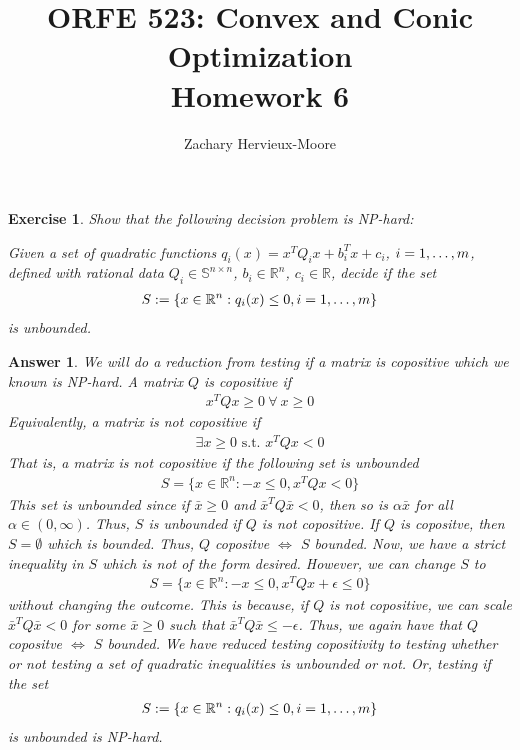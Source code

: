 \documentclass[12pt]{article}
\title{ORFE 523: Convex and Conic Optimization \\ Homework 6}
\author{Zachary Hervieux-Moore}
\date{\displaydate{date}}
\theoremstyle{colon}
\newtheorem{exercise}{Exercise}
\newtheorem*{answer}{Answer}
\begin{document}
\maketitle

\clearpage

\begin{exercise}
  Show that the following decision problem is NP-hard:

  Given a set of quadratic functions $q_i(x) = x^T Q_i x + b_i^T x + c_i$, $i = 1, \mathellipsis, m$, defined with rational data $Q_i \in \mathbb{S}^{n \times n}$, $b_i \in \mathbb{R}^n$, $c_i \in \mathbb{R}$, decide if the set
  \begin{gather*}
    S := \{ x \in \mathbb{R}^n : q_i(x) \leq 0, i = 1, \mathellipsis, m \}
  \end{gather*}
  is unbounded.
\end{exercise}

\begin{answer}
  We will do a reduction from testing if a matrix is copositive which we known is NP-hard. A matrix $Q$ is copositive if
  \begin{gather*}
    x^T Q x \geq 0 \ \forall \ x \geq 0
  \end{gather*}
  Equivalently, a matrix is not copositive if
  \begin{gather*}
    \exists x \geq 0 \text{ s.t. } x^T Q x < 0
  \end{gather*}
  That is, a matrix is not copositive if the following set is unbounded
  \begin{gather*}
    S = \{x \in \mathbb{R}^n : -x \leq 0,  x^T Q x < 0 \}
  \end{gather*}
  This set is unbounded since if $\bar{x} \geq 0$ and $\bar{x}^T Q \bar{x} < 0$, then so is $\alpha \bar{x}$ for all $\alpha \in (0, \infty)$. Thus, $S$ is unbounded if $Q$ is not copositive. If $Q$ is copositve, then $S = \emptyset$ which is bounded. Thus, $Q$ copositve $\Longleftrightarrow$ $S$ bounded. Now, we have a strict inequality in $S$ which is not of the form desired. However, we can change $S$ to
  \begin{gather*}
    S = \{x \in \mathbb{R}^n : -x \leq 0,  x^T Q x + \epsilon \leq 0 \}
  \end{gather*}
  without changing the outcome. This is because, if $Q$ is not copositive, we can scale $\bar{x}^T Q \bar{x} < 0$ for some $\bar{x} \geq 0$ such that $\bar{x}^T Q \bar{x} \leq -\epsilon$. Thus, we again have that $Q$ copositve $\Longleftrightarrow$ $S$ bounded. We have reduced testing copositivity to testing whether or not testing a set of quadratic inequalities is unbounded or not. Or, testing if the set
  \begin{gather*}
    S := \{ x \in \mathbb{R}^n : q_i(x) \leq 0, i = 1, \mathellipsis, m \}
  \end{gather*}
  is unbounded is NP-hard.
\end{answer}
\end{document}
